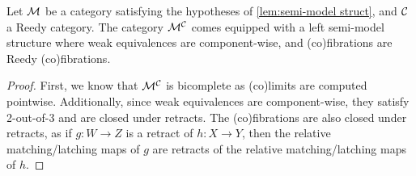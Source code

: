 \documentclass{amsart}
\begin{document}
\begin{thm}
    Let $\mathcal{M}$ be a category satisfying the hypotheses of \ref{lem:semi-model struct}, and $\mathcal{C}$ a Reedy category. The category $\mathcal{M}^{\mathcal{C}}$ comes equipped with a left semi-model structure where weak equivalences are component-wise, and (co)fibrations are Reedy (co)fibrations.
\end{thm}
\begin{proof}
    First, we know that $\mathcal{M}^{\mathcal{C}}$ is bicomplete as (co)limits are computed pointwise. Additionally, since weak equivalences are component-wise, they satisfy 2-out-of-3 and are closed under retracts. The (co)fibrations are also closed under retracts, as if $g:W\to Z$ is a retract of $h:X\to Y$, then the relative matching/latching maps of $g$ are retracts of the relative matching/latching maps of $h$.


\end{proof}
\end{document}
